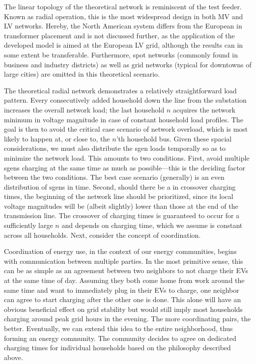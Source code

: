 \documentclass[a4paper,10pt]{report}
\begin{document}
The linear topology of the theoretical network is reminiscent of the test feeder. Known as radial operation, this is the most widespread design in both MV and LV networks. Hereby, the North American system differs from the European in transformer placement and is not discussed further, as the application of the developed model is aimed at the European LV grid, although the results can in some extent be transferable. Furthermore, spot networks (commonly found in business and industry districts) as well as grid networks (typical for downtowns of large cities) are omitted in this theoretical scenario.

The theoretical radial network demonstrates a relatively straightforward load pattern. Every consecutively added household down the line from the substation increases the overall network load; the last household $n$ acquires the network minimum in voltage magnitude in case of constant household load profiles. The goal is then to avoid the critical case scenario of network overload, which is most likely to happen at, or close to, the $n$'th household bus. Given these spacial considerations, we must also distribute the sgen loads temporally so as to minimize the network load. This amounts to two conditions. First, avoid multiple sgens charging at the same time as much as possible---this is the deciding factor between the two conditions. The best case scenario (generally) is an even distribution of sgens in time. Second, should there be a in crossover charging times, the beginning of the network line should be prioritized, since its local voltage magnitudes will be (albeit slightly) lower than those at the end of the transmission line. The crossover of charging times is guaranteed to occur for a sufficiently large $n$ and depends on charging time, which we assume is constant across all households. Next, consider the concept of coordination.

Coordination of energy use, in the context of our energy communities, begins with communication between multiple parties. In the most primitive sense, this can be as simple as an agreement between two neighbors to not charge their EVs at the same time of day. Assuming they both come home from work around the same time and want to immediately plug in their EVs to charge, one neighbor can agree to start charging after the other one is done. This alone will have an obvious beneficial effect on grid stability but would still imply most households charging around peak grid hours in the evening. The more coordinating pairs, the better. Eventually, we can extend this idea to the entire neighborhood, thus forming an energy community. The community decides to agree on dedicated charging times for individual households based on the philosophy described above.
\end{document}
